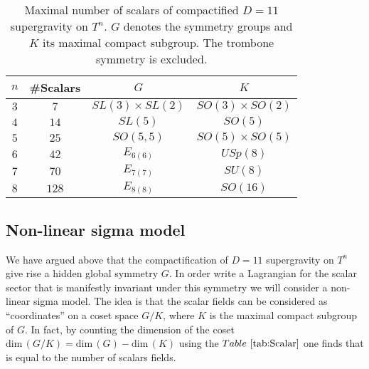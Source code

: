 \begin{table}[]
    \centering
    \caption{Maximal number of scalars of compactified $D=11$ supergravity on $T^n$. $G$ denotes the symmetry groups and $K$ its maximal compact subgroup. The trombone symmetry is excluded.}
    \label{tab:Scalar}
    \begin{tabular}{|c|c|c|c|}\hline
         $n$ & \#Scalars & $G$ & $K$ \\\hline
         $3$ & $7$ & $SL(3)\times SL(2)$ & $SO(3)\times SO(2)$\\\hline
         $4$ & $14$ & $SL(5)$ & $SO(5)$ \\\hline
         $5$ & $25$ & $SO(5,5)$ & $SO(5)\times SO(5)$ \\\hline
         $6$ & $42$ & $E_{6(6)}$ & $USp(8)$ \\\hline
         $7$ & $70$ & $E_{7(7)}$ & $SU(8)$ \\\hline
         $8$ & $128$ & $E_{8(8)}$ & $SO(16)$ \\\hline
    \end{tabular}
\end{table}

\subsection{Non-linear sigma model\label{sec:NonLinearSigmaModels}}
We have argued above that the compactification of $D=11$ supergravity on $T^n$ give rise a hidden global symmetry $G$. In order write a Lagrangian for the scalar sector that is manifestly invariant under this symmetry we will consider a non-linear sigma model. The idea is that the scalar fields can be considered as ``coordinates'' on a coset space $G/K$, where $K$ is the maximal compact subgroup of $G$. In fact, by counting the dimension of the coset $\text{dim}\,(G/K)=\text{dim}\,(G)-\text{dim}\,(K)$ using the $\tabref{tab:Scalar}$ one finds that is equal to the number of scalars fields. 

